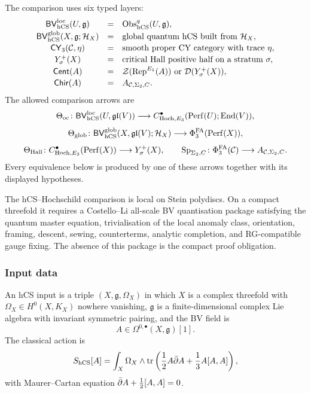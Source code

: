 \begin{definition}
\label{def:hcs-cat-typed-layers}
The comparison uses six typed layers:
\[
\begin{array}{ccl}
\mathsf{BV}^{\mathrm{loc}}_{\hCS}(U,\mathfrak g)
  &=& \Obs_{\hCS}^{q}(U,\mathfrak g),\\[0.4ex]
\mathsf{BV}^{\mathrm{glob}}_{\hCS}(X,\mathfrak g;\mathcal H_X)
  &=& \text{global quantum hCS built from }\mathcal H_X,\\[0.4ex]
\mathsf{CY}_3(\cC,\eta)
  &=& \text{smooth proper CY category with trace }\eta,\\[0.4ex]
Y^+_\sigma(X)
  &=& \text{critical Hall positive half on a stratum }\sigma,\\[0.4ex]
\mathsf{Cent}(A)
  &=& \mathcal Z(\Rep^{E_1}(A))\ \text{or}\ \cD(Y^+_\sigma(X)),\\[0.4ex]
\mathsf{Chir}(A)
  &=& A_{\cC,\Sigma_2,C}.
\end{array}
\]
The allowed comparison arrows are
\[
  \Theta_{\mathrm{oc}}\colon
  \mathsf{BV}^{\mathrm{loc}}_{\mathrm{hCS}}(U,\mathfrak{gl}(V))
  \longrightarrow
  C^\bullet_{\mathrm{Hoch},E_3}(\mathrm{Perf}(U);\operatorname{End}(V)),
\]
\[
  \Theta_{\mathrm{glob}}\colon
  \mathsf{BV}^{\mathrm{glob}}_{\mathrm{hCS}}(X,\mathfrak{gl}(V);\mathcal H_X)
  \longrightarrow
  \Phi^{\mathrm{FA}}_3(\mathrm{Perf}(X)),
\]
\[
  \Theta_{\mathrm{Hall}}\colon
  C^\bullet_{\mathrm{Hoch},E_3}(\mathrm{Perf}(X))
  \longrightarrow
  Y^+_\sigma(X),
  \qquad
  \mathrm{Sp}_{\Sigma_2,C}\colon
  \Phi^{\mathrm{FA}}_3(\mathcal{C})\longrightarrow A_{\mathcal{C},\Sigma_2,C}.
\]
Every equivalence below is produced by one of these arrows together
with its displayed hypotheses.
\end{definition}

The hCS--Hochschild comparison is local on Stein polydiscs. On a
compact threefold it requires a Costello--Li all-scale BV quantisation
package satisfying the quantum master equation, trivialisation of the
local anomaly class, orientation, framing, descent, sewing,
counterterms, analytic completion, and RG-compatible gauge fixing. The
absence of this package is the compact proof obligation.

\subsubsection{Input data}
\label{wn:subsubsec:hcs-cat-inputs}

\begin{definition}
\label{def:hcs-input}
An hCS input is a triple $(X,\mathfrak g,\Omega_X)$ in which $X$ is a
complex threefold with $\Omega_X\in H^0(X,K_X)$ nowhere vanishing,
$\mathfrak g$ is a finite-dimensional complex Lie algebra with invariant
symmetric pairing, and the BV field is
\[
  A\in\Omega^{0,\bullet}(X,\mathfrak g)[1].
\]
The classical action is
\[
  S_{\mathrm{hCS}}[A]
  =
  \int_X \Omega_X\wedge
  \operatorname{tr}
  \left(\frac12 A\bar\partial A+\frac13 A[A,A]\right),
\]
with Maurer--Cartan equation
$\bar\partial A+\frac12[A,A]=0$.
\end{definition}

